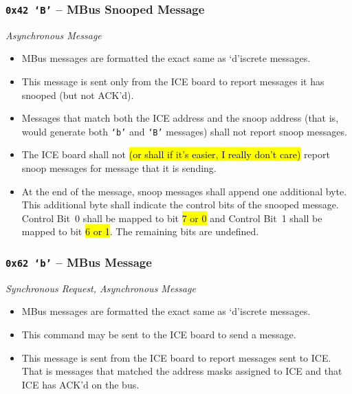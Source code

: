 \subsubsection{\texttt{0x42 `B'} -- MBus Snooped Message}
{\em Asynchronous Message}
\begin{itemize}
  \item MBus messages are formatted the exact same as `d'iscrete messages.
  \item This message is sent only from the ICE board to report messages it has
    snooped (but not ACK'd).
  \item Messages that match both the ICE address and the snoop address (that
    is, would generate both {\tt `b'} and {\tt `B'} messages) shall not report
    snoop messages.
  \item The ICE board shall not \hl{(or shall if it's easier, I really don't
    care)} report snoop messages for message that it is sending.
  \item At the end of the message, snoop messages shall append one additional
    byte. This additional byte shall indicate the control bits of the snooped
    message. Control Bit~0 shall be mapped to bit \hl{7 or 0} and Control
    Bit~1 shall be mapped to bit \hl{6 or 1}. The remaining bits are undefined.
\end{itemize}

\subsubsection{\texttt{0x62 `b'} -- MBus Message}
{\em Synchronous Request, Asynchronous Message}
\begin{itemize}
  \item MBus messages are formatted the exact same as `d'iscrete messages.
  \item This command may be sent to the ICE board to send a message.
  \item This message is sent from the ICE board to report messages sent to
    ICE. That is messages that matched the address masks assigned to ICE and
    that ICE has ACK'd on the bus.
\end{itemize}

